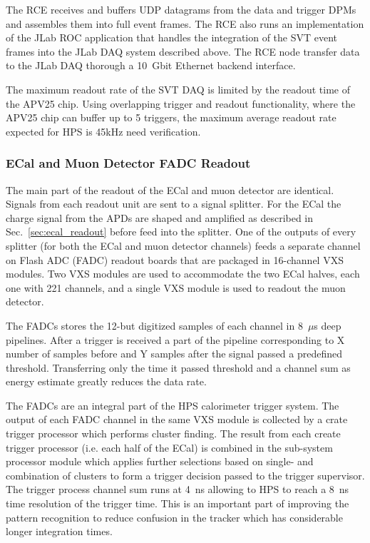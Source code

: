 The RCE receives and buffers UDP datagrams from the data and trigger DPMs and
 assembles them into full event frames. The RCE also runs an implementation of the JLab ROC application that handles the integration of the SVT event frames into the JLab DAQ 
 system described above. The RCE node transfer data to the JLab DAQ  
 thorough a 10~Gbit Ethernet backend interface. 


The maximum readout rate of the SVT DAQ  is limited by the readout time 
of the APV25 chip. Using overlapping trigger and readout functionality, where the 
APV25 chip can buffer up to 5 triggers, the maximum average readout rate expected for 
HPS is 45kHz {\color{red} need verification}.   







\subsubsection{ECal and Muon Detector FADC Readout}
\label{sec:ecal_daq}
The main part of the readout of the ECal and muon detector are identical. Signals from each 
readout unit are sent to a signal splitter. For the ECal the charge signal from the APDs are 
shaped and amplified as described in Sec.~\ref{sec:ecal_readout} before feed into the 
splitter. One of the outputs of every splitter (for both the ECal and muon detector channels) 
feeds a separate channel on Flash ADC (FADC) readout boards that are packaged in 
16-channel VXS modules. Two VXS modules are used to accommodate the two ECal 
halves, each one with 221 channels, and a single VXS module is used to readout the muon 
detector. 

The FADCs stores the 12-but digitized samples of each channel in 8~$\mu$s deep pipelines. 
After a trigger is received a part of the pipeline corresponding to X number of samples 
before and Y samples after the signal passed a predefined threshold. Transferring only 
the time it passed threshold and a channel sum as energy estimate greatly reduces the data rate. 


The FADCs are an integral part of the HPS calorimeter trigger system. The output of each 
FADC channel in the same VXS module is collected by a crate trigger processor which performs cluster finding. The result from each create trigger processor (i.e. each half of 
the ECal) is combined in the sub-system processor module which applies further selections 
based on single- and combination of clusters to form a trigger decision passed to the trigger 
supervisor. The trigger process channel sum runs at 4~ns allowing to HPS to reach a 8~ns 
time resolution of the trigger time. This is an important part of improving 
the pattern recognition to reduce confusion in the tracker which has considerable longer 
integration times. 


